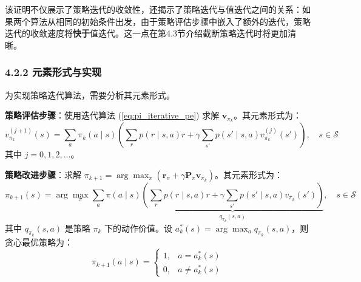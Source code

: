 \documentclass[UTF8]{article}
\begin{document}
该证明不仅展示了策略迭代的收敛性，还揭示了策略迭代与值迭代之间的关系：如果两个算法从相同的初始条件出发，由于策略评估步骤中嵌入了额外的迭代，策略迭代的收敛速度将\textbf{快于}值迭代。这一点在第4.3节介绍截断策略迭代时将更加清晰。

\subsubsection*{4.2.2 元素形式与实现}

为实现策略迭代算法，需要分析其元素形式。

\textbf{策略评估步骤}：使用迭代算法 (\ref{eq:pi_iterative_pe}) 求解 $\boldsymbol{v}_{\pi_k}$。其元素形式为：
\[
v_{\pi_k}^{(j+1)}(s) = \sum_{a} \pi_k(a \mid s) \left( \sum_{r} p(r \mid s,a) r + \gamma \sum_{s'} p(s' \mid s,a) v_{\pi_k}^{(j)}(s') \right), \quad s \in \mathcal{S}
\]
其中 $j = 0, 1, 2, \dots$。

\textbf{策略改进步骤}：求解 $\pi_{k+1} = \arg\max_\pi (\boldsymbol{r}_\pi + \gamma \boldsymbol{P}_\pi \boldsymbol{v}_{\pi_k})$。其元素形式为：
\[
\pi_{k+1}(s) = \arg\max_{\pi} \sum_{a} \pi(a \mid s) \underbrace{\left( \sum_{r} p(r \mid s,a) r + \gamma \sum_{s'} p(s' \mid s,a) v_{\pi_k}(s') \right)}_{q_{\pi_k}(s,a)}, \quad s \in \mathcal{S}
\]
其中 $q_{\pi_k}(s,a)$ 是策略 $\pi_k$ 下的动作价值。设 $a_k^*(s) = \arg\max_a q_{\pi_k}(s,a)$，则贪心最优策略为：
\[
\pi_{k+1}(a \mid s) =
\begin{cases}
1, & a = a_k^*(s) \\
0, & a \neq a_k^*(s)
\end{cases}
\]
\end{document}
